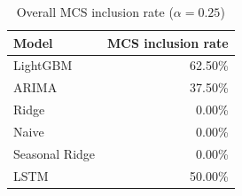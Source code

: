 \begin{table}
\caption{Overall MCS inclusion rate ($\alpha=0.25$)}
\begin{tabular}{lr}
\toprule
Model & MCS inclusion rate \\
\midrule
LightGBM & 62.50\% \\
ARIMA & 37.50\% \\
Ridge & 0.00\% \\
Naive & 0.00\% \\
Seasonal Ridge & 0.00\% \\
LSTM & 50.00\% \\
\bottomrule
\end{tabular}
\end{table}
